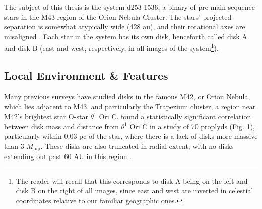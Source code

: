 The subject of this thesis is the system d253-1536, a binary of pre-main sequence stars in the M43 region of the Orion Nebula Cluster. The stars' projected separation is somewhat atypically wide (428 au), and their rotational axes are misaligned \citep{Williams2014}. Each star in the system has its own disk, henceforth called disk A and disk B (east and west, respectively, in all images of the system\footnote{The reader will recall that this corresponds to disk A being on the left and disk B on the right of all images, since east and west are inverted in celestial coordinates relative to our familiar geographic ones.}).

\subsection{Local Environment \& Features}
Many previous surveys have studied disks in the famous M42, or Orion Nebula, which lies adjacent to M43, and particularly the Trapezium cluster, a region near M42's brightest star O-star $\theta^1$ Ori C. \citet{Mann2014} found a statistically significant correlation between disk mass and distance from $\theta^1$ Ori C in a study of 70 proplyds (Fig. \ref{fig:onc_disk_relations}), particularly within 0.03 pc of the star, where there is a lack of disks more massive than 3 $M_\text{jup}$. These disks are also truncated in radial extent, with no disks extending out past 60 AU in this region \citep{Eisner2018}.


\begin{figure}[htp]
  \hspace*{\fill}%
  \hfill%
  \hspace*{\fill}%
  \label{fig:onc_disk_relations}
\end{figure}


